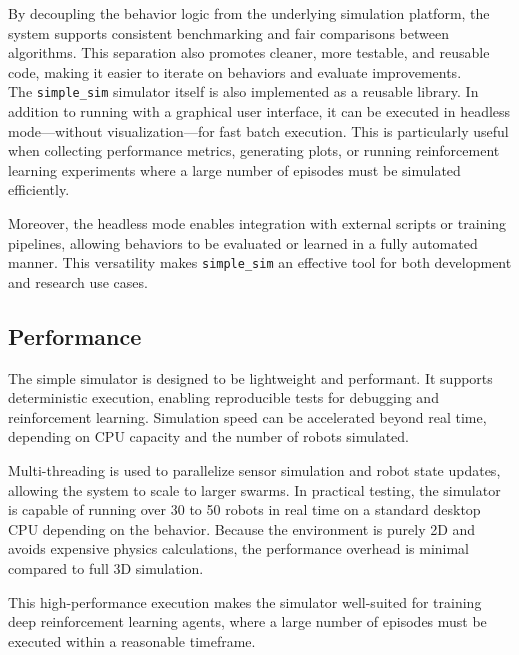 By decoupling the behavior logic from the underlying simulation platform, the system supports consistent benchmarking and fair comparisons between algorithms. This separation also promotes cleaner, more testable, and reusable code, making it easier to iterate on behaviors and evaluate improvements.\\

The \texttt{simple\_sim} simulator itself is also implemented as a reusable library. In addition to running with a graphical user interface, it can be executed in headless mode—without visualization—for fast batch execution. This is particularly useful when collecting performance metrics, generating plots, or running reinforcement learning experiments where a large number of episodes must be simulated efficiently.

Moreover, the headless mode enables integration with external scripts or training pipelines, allowing behaviors to be evaluated or learned in a fully automated manner. This versatility makes \texttt{simple\_sim} an effective tool for both development and research use cases.

\subsection{Performance} 
The simple simulator is designed to be lightweight and performant. It supports deterministic execution, enabling reproducible tests for debugging and reinforcement learning. Simulation speed can be accelerated beyond real time, depending on CPU capacity and the number of robots simulated.

Multi-threading is used to parallelize sensor simulation and robot state updates, allowing the system to scale to larger swarms. In practical testing, the simulator is capable of running over 30 to 50 robots in real time on a standard desktop CPU depending on the behavior. Because the environment is purely 2D and avoids expensive physics calculations, the performance overhead is minimal compared to full 3D simulation.

This high-performance execution makes the simulator well-suited for training deep reinforcement learning agents, where a large number of episodes must be executed within a reasonable timeframe.
